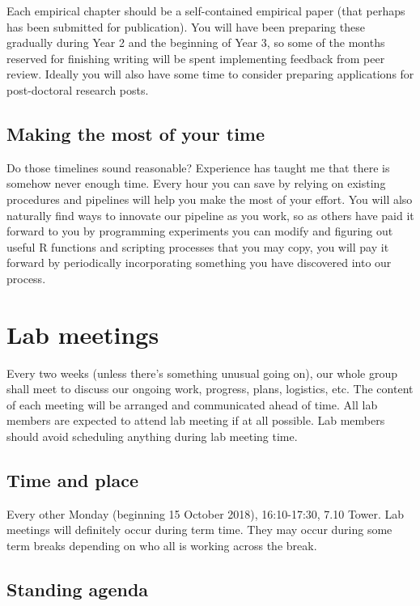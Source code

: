\documentclass[12pt,]{book}
\theoremstyle{definition}
\theoremstyle{definition}
\theoremstyle{definition}
\theoremstyle{remark}
\begin{document}
Each empirical chapter should be a self-contained empirical paper (that
perhaps has been submitted for publication). You will have been
preparing these gradually during Year 2 and the beginning of Year 3, so
some of the months reserved for finishing writing will be spent
implementing feedback from peer review. Ideally you will also have some
time to consider preparing applications for post-doctoral research
posts.

\section{Making the most of your
time}\label{making-the-most-of-your-time}

Do those timelines sound reasonable? Experience has taught me that there
is somehow never enough time. Every hour you can save by relying on
existing procedures and pipelines will help you make the most of your
effort. You will also naturally find ways to innovate our pipeline as
you work, so as others have paid it forward to you by programming
experiments you can modify and figuring out useful R functions and
scripting processes that you may copy, you will pay it forward by
periodically incorporating something you have discovered into our
process.

\chapter{Lab meetings}\label{lab-meetings}

Every two weeks (unless there's something unusual going on), our whole
group shall meet to discuss our ongoing work, progress, plans,
logistics, etc. The content of each meeting will be arranged and
communicated ahead of time. All lab members are expected to attend lab
meeting if at all possible. Lab members should avoid scheduling anything
during lab meeting time.

\section{Time and place}\label{time-and-place}

Every other Monday (beginning 15 October 2018), 16:10-17:30, 7.10 Tower.
Lab meetings will definitely occur during term time. They may occur
during some term breaks depending on who all is working across the
break.

\section{Standing agenda}\label{standing-agenda}
\end{document}
